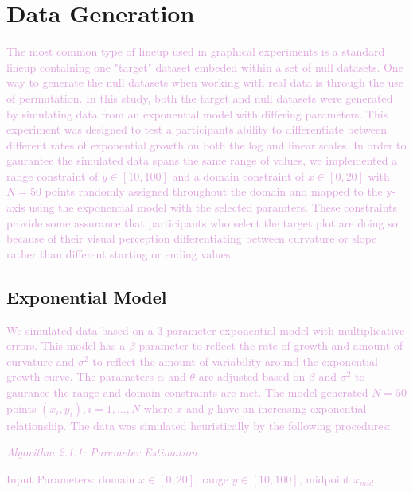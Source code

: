 \documentclass[]{interact}
\theoremstyle{plain}%
\theoremstyle{definition}
\theoremstyle{remark}
\begin{document}
\hypertarget{data-generation}{%
\section{Data Generation}\label{data-generation}}

\textcolor{Plum}{
The most common type of lineup used in graphical experiments is a standard lineup containing one "target" dataset embeded within a set of null datasets. 
One way to generate the null datasets when working with real data is through the use of permutation. 
In this study, both the target and null datasets were generated by simulating data from an exponential model with differing parameters. 
This experiment was designed to test a participants ability to differentiate between different rates of exponential growth on both the log and linear scales. 
In order to gaurantee the simulated data spans the same range of values, we implemented a range constraint of $y\in [10,100]$ and a domain constraint of $x\in [0,20]$ with $N = 50$ points randomly assigned throughout the domain and mapped to the y-axis using the exponential model with the selected paramters. 
These constraints provide some assurance that participants who select the target plot are doing so because of their visual perception differentiating between curvature or slope rather than different starting or ending values. 
}

\hypertarget{exponential-model}{%
\subsection{Exponential Model}\label{exponential-model}}

\textcolor{Plum}{
We simulated data based on a 3-parameter exponential model with multiplicative errors. 
This model has a $\beta$ parameter to reflect the rate of growth and amount of curvature and $\sigma^2$ to reflect the amount of variability around the exponential growth curve. 
The parameters $\alpha$ and $\theta$ are adjusted based on $\beta$ and $\sigma^2$ to gauranee the range and domain constraints are met. 
The model generated $N = 50$ points $(x_i, y_i), i = 1,...,N$ where $x$ and $y$ have an increasing exponential relationship. 
The data was simulated heuristically by the following procedures:
}
\vspace{3 mm}

\textcolor{Plum}{\textit{Algorithm 2.1.1: Paremeter Estimation}}

\textcolor{Plum}{Input Parameters: domain $x\in[0,20]$, range $y\in[10,100]$, midpoint $x_{mid}$.}
\end{document}
